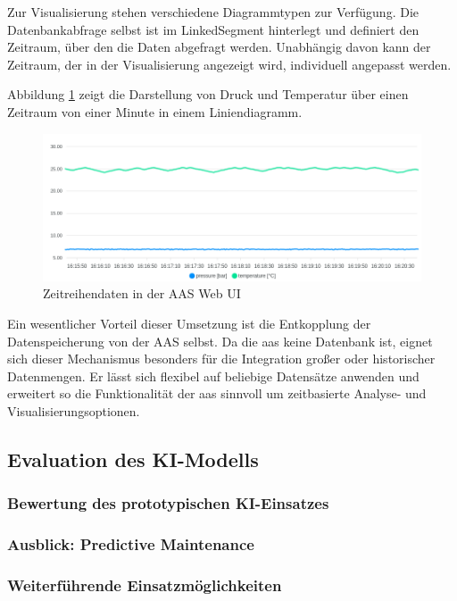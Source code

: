 Zur Visualisierung stehen verschiedene Diagrammtypen zur Verfügung. 
Die Datenbankabfrage selbst ist im LinkedSegment hinterlegt und definiert den Zeitraum, über den die Daten abgefragt werden.
Unabhängig davon kann der Zeitraum, der in der Visualisierung angezeigt wird, individuell angepasst werden.

Abbildung \ref{fig:LiniendiagrammBaSyx} zeigt die Darstellung von Druck und Temperatur über einen Zeitraum von einer Minute in einem Liniendiagramm.

\begin{figure}[htbp]
    \centering
        \includegraphics[width=1\textwidth]{Bilder/Ergebnisse/DynamischeDaten/ZeitreihenDaten/line.png}
    \caption{Zeitreihendaten in der AAS Web UI}
    \label{fig:LiniendiagrammBaSyx}
\end{figure}

Ein wesentlicher Vorteil dieser Umsetzung ist die Entkopplung der Datenspeicherung von der AAS selbst. 
Da die \acs{aas} keine Datenbank ist, eignet sich dieser Mechanismus besonders für die Integration großer oder historischer Datenmengen. 
Er lässt sich flexibel auf beliebige Datensätze anwenden und erweitert so die Funktionalität der \acs{aas} sinnvoll um zeitbasierte Analyse- und Visualisierungsoptionen.

\subsection{Evaluation des KI-Modells}
\subsubsection{Bewertung des prototypischen KI-Einsatzes}
\subsubsection{Ausblick: Predictive Maintenance}
\subsubsection{Weiterführende Einsatzmöglichkeiten}

